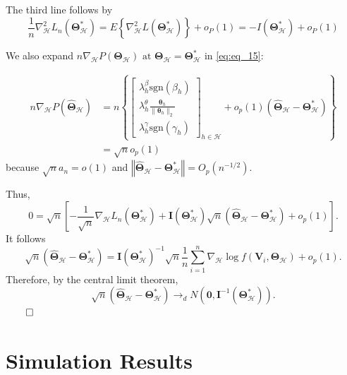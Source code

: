 \documentclass[12pt,letter]{article}\usepackage[]{graphicx}\usepackage[]{color}
\newcommand{\bTheta}{\boldsymbol{\Theta}}
\newcommand{\btheta}{\boldsymbol{\theta}}
\begin{document}
The third line follows by
\[\frac{1}{n} \nabla_{\mathcal{H}}^{2} L_{n}\left(\boldsymbol{\bTheta}_{\mathcal{H}}^{*}\right)=E\left\{\nabla_{\mathcal{H}}^{2} L\left(\boldsymbol{\bTheta}_{\mathcal{H}}^{*}\right)\right\}+o_{P}(1)=-I\left(\boldsymbol{\bTheta}_{\mathcal{H}}^{*}\right)+o_{P}(1)\]

We also expand $n\nabla_{\mathcal{H}}P\left(\boldsymbol{\Theta}_{\mathcal{H}}\right)\text{ at }\boldsymbol{\Theta}_{\mathcal{H}}=\boldsymbol{\Theta}_{\mathcal{H}}^{*}$ in \eqref{eq:eq_15}:

\[
\begin{aligned}n\nabla_{\mathcal{H}}P\left(\widehat{\boldsymbol{\Theta}}_{\mathcal{H}}\right) & =n\left\{ \left[\begin{array}{c}
{\lambda_{h}^{\beta}\textrm{sgn}\left(\beta_{h}\right)}\\
{\lambda_{h}^{\theta}  \frac{\btheta_{h}}{\| \btheta_{h} \|_2}    }\\
{\lambda_{h}^{\gamma}\textrm{sgn}\left(\gamma_{h}\right)}
\end{array}\right]_{h\in\mathcal{H}}+o_{p}(1)\left(\widehat{\boldsymbol{\Theta}}_{\mathcal{H}}-\boldsymbol{\Theta}_{\mathcal{H}}^{*}\right)\right\} \\
& =\sqrt{n}o_{p}(1)
\end{aligned}
\]
because $\sqrt{n}a_{n}=$$o(1)$ and $\left\Vert \widehat{\boldsymbol{\Theta}}_{\mathcal{H}}-\boldsymbol{\Theta}_{\mathcal{H}}^{*}\right\Vert =O_{p}\left(n^{-1/2}\right)$.



Thus, 
\[
0=\sqrt{n}\left[-\frac{1}{\sqrt{n}}\nabla_{\mathcal{H}}L_{n}\left(\boldsymbol{\Theta}_{\mathcal{H}}^{*}\right)+\boldsymbol{I}\left(\boldsymbol{\Theta}_{\mathcal{H}}^{*}\right)\sqrt{n}\left(\widehat{\boldsymbol{\Theta}}_{\mathcal{H}}-\boldsymbol{\Theta}_{\mathcal{H}}^{*}\right)+o_{p}(1)\right].
\]
It follows 
\[
\sqrt{n}\left(\widehat{\boldsymbol{\Theta}}_{\mathcal{H}}-\boldsymbol{\Theta}_{\mathcal{H}}^{*}\right)=\boldsymbol{I}\left(\boldsymbol{\Theta}_{\mathcal{H}}^{*}\right)^{-1}\sqrt{n}\frac{1}{n}\sum_{i=1}^{n}\nabla_{\mathcal{H}}\log f\left(\boldsymbol{V}_{i},\boldsymbol{\Theta}_{\mathcal{H}}\right)+o_{p}(1).
\]
Therefore, by the central limit theorem, 
\[
\sqrt{n}\left(\widehat{\boldsymbol{\Theta}}_{\mathcal{H}}-\boldsymbol{\Theta}_{\mathcal{H}}^{*}\right)\rightarrow_{d}N\left(\mathbf{0},\boldsymbol{I}^{-1}\left(\boldsymbol{\Theta}_{\mathcal{H}}^{*}\right)\right).
\]
$\qed$


\section{Simulation Results} \label{ap:simulation}
\end{document}
